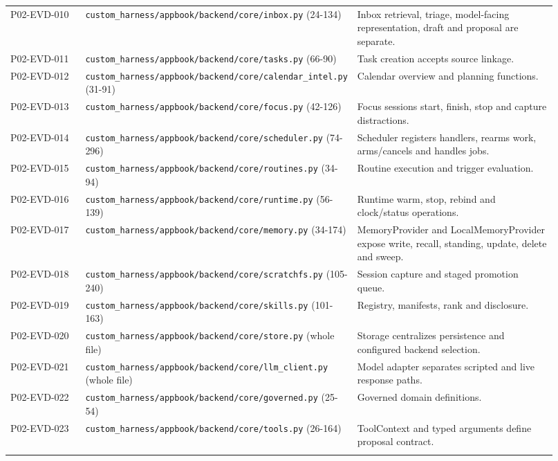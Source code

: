\documentclass[10pt,letterpaper]{article}
\begin{document}
\begin{longtable}{@{}>{\raggedright\arraybackslash}p{0.16\linewidth}>{\raggedright\arraybackslash}p{0.34\linewidth}>{\raggedright\arraybackslash}p{0.42\linewidth}@{}}
P02-EVD-010 & \nolinkurl{custom_harness/appbook/backend/core/inbox.py} (24-134) & Inbox retrieval, triage, model-facing representation, draft and proposal are separate.\\\addlinespace
P02-EVD-011 & \nolinkurl{custom_harness/appbook/backend/core/tasks.py} (66-90) & Task creation accepts source linkage.\\\addlinespace
P02-EVD-012 & \nolinkurl{custom_harness/appbook/backend/core/calendar_intel.py} (31-91) & Calendar overview and planning functions.\\\addlinespace
P02-EVD-013 & \nolinkurl{custom_harness/appbook/backend/core/focus.py} (42-126) & Focus sessions start, finish, stop and capture distractions.\\\addlinespace
P02-EVD-014 & \nolinkurl{custom_harness/appbook/backend/core/scheduler.py} (74-296) & Scheduler registers handlers, rearms work, arms/cancels and handles jobs.\\\addlinespace
P02-EVD-015 & \nolinkurl{custom_harness/appbook/backend/core/routines.py} (34-94) & Routine execution and trigger evaluation.\\\addlinespace
P02-EVD-016 & \nolinkurl{custom_harness/appbook/backend/core/runtime.py} (56-139) & Runtime warm, stop, rebind and clock/status operations.\\\addlinespace
P02-EVD-017 & \nolinkurl{custom_harness/appbook/backend/core/memory.py} (34-174) & MemoryProvider and LocalMemoryProvider expose write, recall, standing, update, delete and sweep.\\\addlinespace
P02-EVD-018 & \nolinkurl{custom_harness/appbook/backend/core/scratchfs.py} (105-240) & Session capture and staged promotion queue.\\\addlinespace
P02-EVD-019 & \nolinkurl{custom_harness/appbook/backend/core/skills.py} (101-163) & Registry, manifests, rank and disclosure.\\\addlinespace
P02-EVD-020 & \nolinkurl{custom_harness/appbook/backend/core/store.py} (whole file) & Storage centralizes persistence and configured backend selection.\\\addlinespace
P02-EVD-021 & \nolinkurl{custom_harness/appbook/backend/core/llm_client.py} (whole file) & Model adapter separates scripted and live response paths.\\\addlinespace
P02-EVD-022 & \nolinkurl{custom_harness/appbook/backend/core/governed.py} (25-54) & Governed domain definitions.\\\addlinespace
P02-EVD-023 & \nolinkurl{custom_harness/appbook/backend/core/tools.py} (26-164) & ToolContext and typed arguments define proposal contract.\\\addlinespace

\end{longtable}
\end{document}
